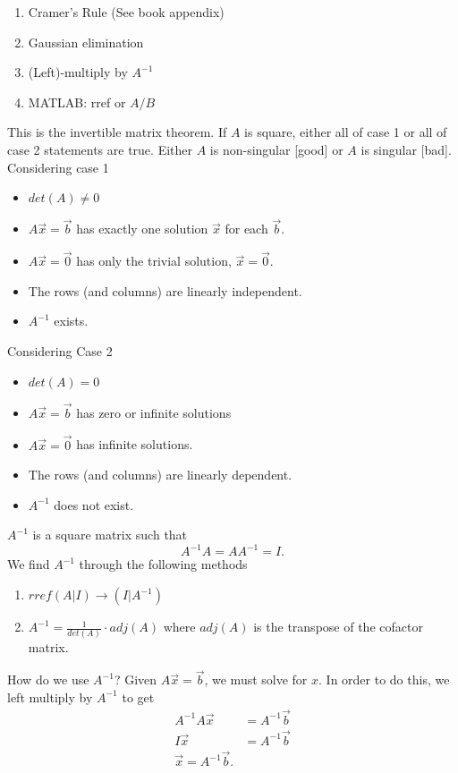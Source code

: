 \begin{enumerate}
  \item Cramer's Rule (See book appendix)
  \item Gaussian elimination
  \item (Left)-multiply by $A^{-1}$
  \item MATLAB: rref or $A / B$
\end{enumerate}

\begin{theorem}
  This is the invertible matrix theorem. If $A$ is square, either all of case 1 or all of case 2 statements are true. Either $A$ is non-singular [good] or $A$ is singular [bad]. \newline Considering case 1
  \begin{itemize}
    \item $det(A)\neq 0$
    \item $A\vec{x}=\vec{b}$ has exactly one solution $\vec{x}$ for each $\vec{b}$.
    \item $A\vec{x}=\vec{0}$ has only the trivial solution, $\vec{x}=\vec{0}$.
    \item The rows (and columns) are linearly independent.
    \item $A^{-1}$ exists.
  \end{itemize}
  Considering Case 2
  \begin{itemize}
    \item $det(A)=0$
    \item $A\vec{x}=\vec{b}$ has zero or infinite solutions
    \item $A\vec{x}=\vec{0}$ has infinite solutions.
    \item The rows (and columns) are linearly dependent.
    \item $A^{-1}$ does not exist.
  \end{itemize}
\end{theorem}
$A^{-1}$ is a square matrix such that \[
A^{-1}A=A A^{-1}=I
.\] We find $A^{-1}$ through the following methods
\begin{enumerate}
  \item $rref(A|I)\to(I|A^{-1})$
  \item $A^{-1}=\frac{1}{det(A)}\cdot adj(A)$ where $adj(A)$ is the transpose of the cofactor matrix.
\end{enumerate}
How do we use $A^{-1}$? Given $A\vec{x}=\vec{b}$, we must solve for $x$. In order to do this, we left multiply by $A^{-1}$ to get 
\begin{align*}
  A^{-1}A\vec{x}&=A^{-1}\vec{b}\\
  I\vec{x}&=A^{-1}\vec{b}\\
  \vec{x}=A^{-1}\vec{b}
.\end{align*}
